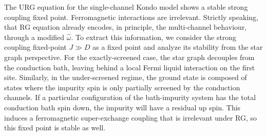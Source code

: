 \documentclass[reprint,onecolumn,prb,superscriptaddress]{revtex4-2}
\begin{document}
The URG equation for the single-channel Kondo model \cite{kondo_urg} shows a stable strong coupling fixed point. Ferromagnetic interactions are irrelevant. Strictly speaking, that RG equation already encodes, in principle, the multi-channel behaviour, through a modified \(\hat \omega\). To extract this information, we consider the strong coupling fixed-point \(J \gg D\) as a fixed point and analyze its stability from the star graph perspective. For the exactly-screened case, the star graph decouples from the conduction bath, leaving behind a local Fermi liquid interaction on the first site. Similarly, in the under-screened regime, the ground state is composed of states where the impurity spin is only partially screened by the conduction channels. If a particular configuration of the bath-impurity system has the total conduction bath spin down, the impurity will have a residual up spin. This induces a ferromagnetic super-exchange coupling that is irrelevant under RG, so this fixed point is stable as well. 
\end{document}
